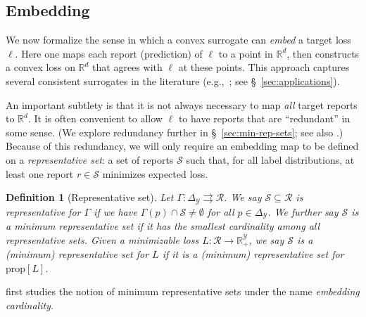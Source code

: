 \documentclass[11pt]{article}
\newcommand{\reals}{\mathbb{R}}
\newcommand{\prop}[1]{\mathrm{prop}[#1]}
\newcommand{\simplex}{\Delta_\Y}
\newcommand{\R}{\mathcal{R}}
\newcommand{\Sc}{\mathcal{S}}
\newcommand{\Y}{\mathcal{Y}}
\newcommand{\toto}{\rightrightarrows}
\newtheorem{definition}{Definition}
\begin{document}
\subsection{Embedding}

We now formalize the sense in which a convex surrogate can \emph{embed} a target loss $\ell$.
Here one maps each report (prediction) of $\ell$ to a point in $\reals^d$, then constructs a convex loss on $\reals^d$ that agrees with $\ell$ at these points.
This approach captures several consistent surrogates in the literature (e.g.,~\citep{ramaswamy2015hierarchical,ramaswamy2016convex,lapin2015top,wang2020weston}; see \S~\ref{sec:applications}).

An important subtlety is that it is not always necessary to map \emph{all} target reports to $\reals^d$.
It is often convenient to allow $\ell$ to have reports that are ``redundant'' in some sense. (We explore redundancy further in \S~\ref{sec:min-rep-sets}; see also \citet{wang2020weston}.)
Because of this redundancy, we will only require an embedding map to be defined on a \emph{representative set}: a set of reports $\Sc$ such that, for all label distributions, at least one report $r\in\Sc$ minimizes expected loss.
\begin{definition}[Representative set]
  Let $\Gamma:\simplex\toto\R$.
  We say $\Sc \subseteq \R$ is \emph{representative for $\Gamma$} if we have $\Gamma(p) \cap \Sc \neq \emptyset$ for all $p\in \simplex$.
  We further say $\Sc$ is a \emph{minimum representative set} if it has the smallest cardinality among all representative sets.
  Given a minimizable loss $L:\R\to\reals^\Y_+$, we say $\Sc$ is a (minimum) representative set for $L$ if it is a (minimum) representative set for $\prop L$.
\end{definition}

\citet{wang2020weston} first studies the notion of minimum representative sets under the name \emph{embedding cardinality}.
\end{document}
